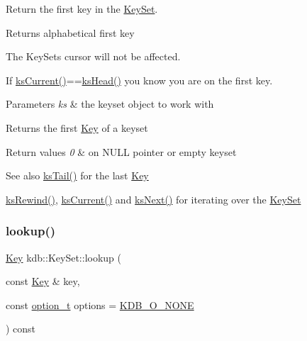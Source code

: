 Return the first key in the \mbox{\hyperlink{classkdb_1_1KeySet}{Key\+Set}}. 

\begin{DoxyReturn}{Returns}
alphabetical first key
\end{DoxyReturn}
The Key\+Sets cursor will not be affected.

If \mbox{\hyperlink{group__keyset_ga4287b9416912c5f2ab9c195cb74fb094}{ks\+Current()}}==\mbox{\hyperlink{group__keyset_gae7dbf3aef70e67b5328475eb3d1f92f5}{ks\+Head()}} you know you are on the first key.


\begin{DoxyParams}{Parameters}
{\em ks} & the keyset object to work with \\
\hline
\end{DoxyParams}
\begin{DoxyReturn}{Returns}
the first \mbox{\hyperlink{classkdb_1_1Key}{Key}} of a keyset 
\end{DoxyReturn}

\begin{DoxyRetVals}{Return values}
{\em 0} & on N\+U\+LL pointer or empty keyset \\
\hline
\end{DoxyRetVals}
\begin{DoxySeeAlso}{See also}
\mbox{\hyperlink{group__keyset_gadca442c4ab43cf532b15091d7711559e}{ks\+Tail()}} for the last \mbox{\hyperlink{group__key}{Key}} 

\mbox{\hyperlink{group__keyset_gabe793ff51f1728e3429c84a8a9086b70}{ks\+Rewind()}}, \mbox{\hyperlink{group__keyset_ga4287b9416912c5f2ab9c195cb74fb094}{ks\+Current()}} and \mbox{\hyperlink{group__keyset_ga317321c9065b5a4b3e33fe1c399bcec9}{ks\+Next()}} for iterating over the \mbox{\hyperlink{group__keyset}{Key\+Set}} 
\end{DoxySeeAlso}
\mbox{\label{classkdb_1_1KeySet_a78125fb19c6aebb0d8fc1a7238b78ace}} 
\subsubsection{\texorpdfstring{lookup()}{lookup()}\hspace{0.1cm}{\footnotesize\ttfamily [1/2]}}
{\footnotesize\ttfamily \mbox{\hyperlink{classkdb_1_1Key}{Key}} kdb\+::\+Key\+Set\+::lookup (\begin{DoxyParamCaption}\item[{const \mbox{\hyperlink{classkdb_1_1Key}{Key}} \&}]{key,  }\item[{const \mbox{\hyperlink{group__keyset_ga98a3d6a4016c9dad9cbd1a99a9c2a45a}{option\+\_\+t}}}]{options = {\ttfamily \mbox{\hyperlink{group__keyset_gga98a3d6a4016c9dad9cbd1a99a9c2a45aa00738455e0ae843c8720809d8287f370}{K\+D\+B\+\_\+\+O\+\_\+\+N\+O\+NE}}} }\end{DoxyParamCaption}) const\hspace{0.3cm}{\ttfamily [inline]}}



